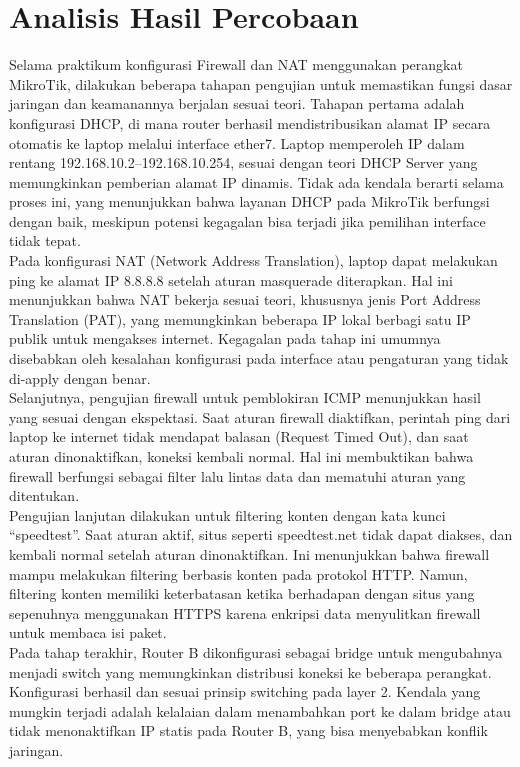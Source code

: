 \section{Analisis Hasil Percobaan}
Selama praktikum konfigurasi Firewall dan NAT menggunakan perangkat MikroTik, dilakukan beberapa tahapan pengujian untuk memastikan fungsi dasar jaringan dan keamanannya berjalan sesuai teori. Tahapan pertama adalah konfigurasi DHCP, di mana router berhasil mendistribusikan alamat IP secara otomatis ke laptop melalui interface ether7. Laptop memperoleh IP dalam rentang 192.168.10.2–192.168.10.254, sesuai dengan teori DHCP Server yang memungkinkan pemberian alamat IP dinamis. Tidak ada kendala berarti selama proses ini, yang menunjukkan bahwa layanan DHCP pada MikroTik berfungsi dengan baik, meskipun potensi kegagalan bisa terjadi jika pemilihan interface tidak tepat. \\ Pada konfigurasi NAT (Network Address Translation), laptop dapat melakukan ping ke alamat IP 8.8.8.8 setelah aturan masquerade diterapkan. Hal ini menunjukkan bahwa NAT bekerja sesuai teori, khususnya jenis Port Address Translation (PAT), yang memungkinkan beberapa IP lokal berbagi satu IP publik untuk mengakses internet. Kegagalan pada tahap ini umumnya disebabkan oleh kesalahan konfigurasi pada interface atau pengaturan yang tidak di-apply dengan benar. \\ Selanjutnya, pengujian firewall untuk pemblokiran ICMP menunjukkan hasil yang sesuai dengan ekspektasi. Saat aturan firewall diaktifkan, perintah ping dari laptop ke internet tidak mendapat balasan (Request Timed Out), dan saat aturan dinonaktifkan, koneksi kembali normal. Hal ini membuktikan bahwa firewall berfungsi sebagai filter lalu lintas data dan mematuhi aturan yang ditentukan. \\ Pengujian lanjutan dilakukan untuk filtering konten dengan kata kunci “speedtest”. Saat aturan aktif, situs seperti speedtest.net tidak dapat diakses, dan kembali normal setelah aturan dinonaktifkan. Ini menunjukkan bahwa firewall mampu melakukan filtering berbasis konten pada protokol HTTP. Namun, filtering konten memiliki keterbatasan ketika berhadapan dengan situs yang sepenuhnya menggunakan HTTPS karena enkripsi data menyulitkan firewall untuk membaca isi paket. \\ Pada tahap terakhir, Router B dikonfigurasi sebagai bridge untuk mengubahnya menjadi switch yang memungkinkan distribusi koneksi ke beberapa perangkat. Konfigurasi berhasil dan sesuai prinsip switching pada layer 2. Kendala yang mungkin terjadi adalah kelalaian dalam menambahkan port ke dalam bridge atau tidak menonaktifkan IP statis pada Router B, yang bisa menyebabkan konflik jaringan.


